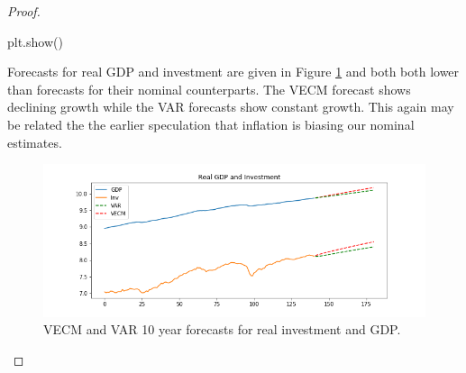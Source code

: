 \documentclass[oneside,reqno]{amsart}
\theoremstyle{definition}
\begin{document}
\begin{enumerate}[label=(\roman*)]
\begin{proof}
\begin{python3code}
plt.show()
\end{python3code}

Forecasts for real GDP and investment are given in Figure \ref{q2-real} and both both lower than forecasts for their nominal counterparts. The VECM forecast shows declining growth while the VAR forecasts show constant growth. This again may be related the the earlier speculation that inflation is biasing our nominal estimates.

\begin{figure}
\includegraphics[width=\textwidth]{q2-real}
\caption{VECM and VAR 10 year forecasts for real investment and GDP.}
\label{q2-real}
\end{figure}

\end{proof}
\end{enumerate}
\end{document}
